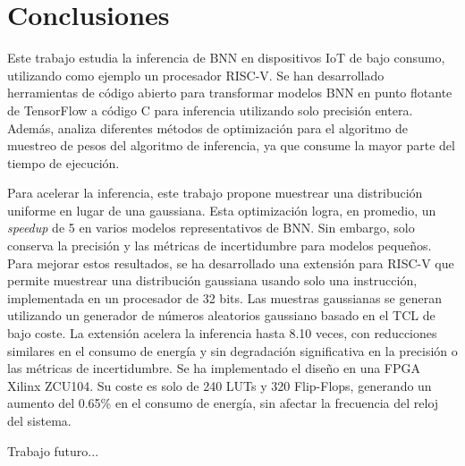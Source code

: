 \chapter{Conclusiones}

Este trabajo estudia la inferencia de BNN en dispositivos IoT de bajo consumo, utilizando como ejemplo un procesador RISC-V. Se han desarrollado herramientas de código abierto para transformar modelos BNN en punto flotante de TensorFlow a código C para inferencia utilizando solo precisión entera. Además, analiza diferentes métodos de optimización para el algoritmo de muestreo de pesos del algoritmo de inferencia, ya que consume la mayor parte del tiempo de ejecución.

Para acelerar la inferencia, este trabajo propone muestrear una distribución uniforme en lugar de una gaussiana. Esta optimización logra, en promedio, un \textit{speedup} de 5 en varios modelos representativos de BNN. Sin embargo, solo conserva la precisión y las métricas de incertidumbre para modelos pequeños. Para mejorar estos resultados, se ha desarrollado una extensión para RISC-V que permite muestrear una distribución gaussiana usando solo una instrucción, implementada en un procesador de 32 bits. Las muestras gaussianas se generan utilizando un generador de números aleatorios gaussiano basado en el TCL de bajo coste. La extensión acelera la inferencia hasta 8.10 veces, con reducciones similares en el consumo de energía y sin degradación significativa en la precisión o las métricas de incertidumbre. Se ha implementado el diseño en una FPGA Xilinx ZCU104. Su coste es solo de 240 LUTs y 320 Flip-Flops, generando un aumento del 0.65\% en el consumo de energía, sin afectar la frecuencia del reloj del sistema.

Trabajo futuro... \todo

